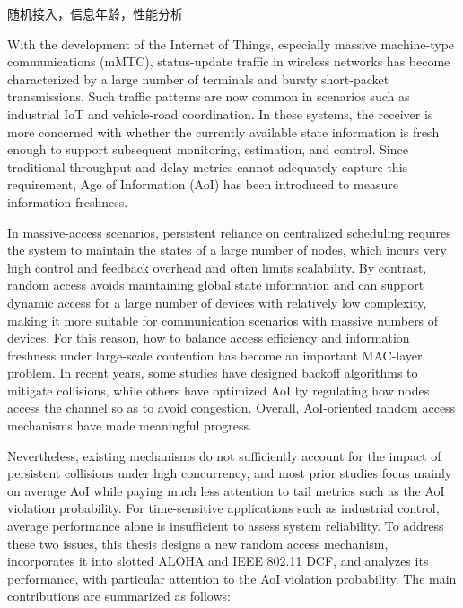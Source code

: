 \begin{keywordCN}
随机接入，信息年龄，性能分析
\end{keywordCN}

\begin{abstractEN}
\setlength{\baselineskip}{23pt} %

With the development of the Internet of Things, especially massive machine-type communications (mMTC), status-update traffic in wireless networks has become characterized by a large number of terminals and bursty short-packet transmissions. Such traffic patterns are now common in scenarios such as industrial IoT and vehicle-road coordination. In these systems, the receiver is more concerned with whether the currently available state information is fresh enough to support subsequent monitoring, estimation, and control. Since traditional throughput and delay metrics cannot adequately capture this requirement, Age of Information (AoI) has been introduced to measure information freshness.

In massive-access scenarios, persistent reliance on centralized scheduling requires the system to maintain the states of a large number of nodes, which incurs very high control and feedback overhead and often limits scalability. By contrast, random access avoids maintaining global state information and can support dynamic access for a large number of devices with relatively low complexity, making it more suitable for communication scenarios with massive numbers of devices. For this reason, how to balance access efficiency and information freshness under large-scale contention has become an important MAC-layer problem. In recent years, some studies have designed backoff algorithms to mitigate collisions, while others have optimized AoI by regulating how nodes access the channel so as to avoid congestion. Overall, AoI-oriented random access mechanisms have made meaningful progress.

Nevertheless, existing mechanisms do not sufficiently account for the impact of persistent collisions under high concurrency, and most prior studies focus mainly on average AoI while paying much less attention to tail metrics such as the AoI violation probability. For time-sensitive applications such as industrial control, average performance alone is insufficient to assess system reliability. To address these two issues, this thesis designs a new random access mechanism, incorporates it into slotted ALOHA and IEEE 802.11 DCF, and analyzes its performance, with particular attention to the AoI violation probability. The main contributions are summarized as follows:


\end{abstractEN}
